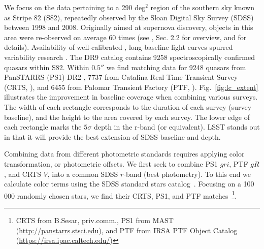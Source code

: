 \documentclass[twocolumn]{aastex62}
\begin{document}
We focus on the data pertaining to a 290 deg$^{2}$ region of the southern sky known as Stripe 82 (S82), repeatedly observed by the Sloan Digital Sky Survey (SDSS) between 1998 and 2008. Originally aimed at supernova discovery, objects in this area were re-observed on average 60 times (see \citealt{macleod2012}, Sec. 2.2 for overview, and \citealt{annis2014} for details). Availability of well-calibrated \citep{ivezic2007}, long-baseline light curves spurred variability research \citep{sesar2007}. The DR9 catalog \citep{schneider2008} contains 9258 spectroscopically confirmed quasars within S82. Within  $0.5 ''$  we find matching data for 9248 quasars from  PanSTARRS (PS1) DR2 \citep{chambers2011,flewelling2018}, 7737 from Catalina Real-Time Transient Survey (CRTS, \citealt{drake2009}), and  6455 from Palomar Transient Factory (PTF, \citealt{rau2009}). Fig.~\ref{fig:lc_extent} illustrates the improvement in baseline coverage when combining various surveys. The width of each rectangle corresponds to the duration of each survey (survey baseline), and the height to the area covered by each survey. The lower edge of each rectangle marks the $5\sigma$ depth in the r-band (or equivalent). LSST stands out in that it will provide the best extension of SDSS baseline and depth.  



\begin{figure*} %
\caption{An illustration of survey baseline, sky area covered, and depth. The width of each rectangle corresponds to the extent of real or simulated light curves for Stripe 82 quasars for each survey. This includes SDSS DR7, CRTS DR2, PS1 DR2, PTF DR2, ZTF DR1, and for LSST the full 10-year survey. The lower edge of each rectangle (marked by a solid thick line) corresponds to the $5\sigma$ limiting magnitude (SDSS $r$, PS1 $r$, PTF $R$, ZTF $r$, LSST $r$, CRTS $V$). The vertical extent of each rectangle corresponds to the total survey area (for SDSS, up to DR15).  Note how PS1 and PTF extend the baseline of SDSS by approximately $50\%$, and how inclusion of LSST roughly triples the SDSS baseline. For reference, the area covered by LSST is $25 000$ sq.deg., corresponding to  $60\%$ of the whole sky (which has the area of $4\pi$ steradians, i.e. 41253 sq.deg.).}
\label{fig:lc_extent}
\end{figure*} 


Combining data from different photometric standards requires applying color transformation, or photometric offsets. We first seek to combine PS1 $gri$,  PTF $gR$, and CRTS $V$, into a common SDSS $r$-band (best photometry). To this end we calculate  color terms using the SDSS standard stars catalog~\citep{ivezic2007}. Focusing on a 100 000 randomly chosen stars, we find their CRTS, PS1, and PTF matches~\footnote{CRTS from B.Sesar, priv.comm., PS1 from MAST (\url{http://panstarrs.stsci.edu}), and PTF from IRSA PTF Object Catalog (\url{https://irsa.ipac.caltech.edu/})}. 
\end{document}
